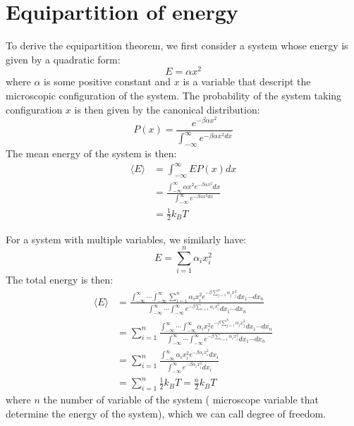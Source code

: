 \documentclass{article}
\begin{document}
\section{Equipartition of energy}
To derive the equipartition theorem, we first consider a system
whose energy is given by a quadratic form:
\begin{equation}
    E = \alpha x^2
\end{equation}
where $\alpha$ is some positive constant and $x$ is a variable
that descript the microscopic configuration of the system. The 
probability of the system taking configuration $x$ is then 
given by the canonical distribution:
\begin{equation}
    P(x) = \frac{e^{-\beta \alpha x^2}}{\int_{-\infty}^{\infty} e^{-\beta \alpha x^2 dx}}
\end{equation}
The mean energy of the system is then:
\begin{align}
    \langle E \rangle &= \int_{-\infty}^{\infty} E P(x) dx \\
        & = \frac{\int_{-\infty}^{\infty} \alpha x^2 e^{-\beta \alpha x^2} dx}{\int_{-\infty}^{\infty} e^{-\beta \alpha x^2 dx}} \\
        & = \frac{1}{2} k_B T
\end{align}

For a system with multiple variables, we similarly have:
\begin{equation}
    E = \sum_{i=1}^n \alpha_i x_i^2
\end{equation}
The total energy is then:
\begin{align}
    \langle E \rangle 
        & = \frac{\int_{-\infty}^{\infty}\cdots\int_{-\infty}^{\infty} \sum_{i=1}^n \alpha_i x_i^2 e^{-\beta \sum_{j=1}^n \alpha_j x_j^2} dx_1 \cdots dx_n}{\int_{-\infty}^{\infty}\cdots\int_{-\infty}^{\infty} e^{-\beta \sum_{i=1} \alpha_i x_i^2} dx_1 \cdots dx_n} \\
        & = \sum_{i=1}^n \frac{\int_{-\infty}^{\infty}\cdots\int_{-\infty}^{\infty} \alpha_i x_i^2 e^{-\beta \sum_{j=1}^n \alpha_j x_j^2} dx_1 \cdots dx_n}{\int_{-\infty}^{\infty}\cdots\int_{-\infty}^{\infty} e^{-\beta \sum_{i=1} \alpha_i x_i^2} dx_1 \cdots dx_n} \\
        & = \sum_{i=1}^n \frac{\int_{-\infty}^{\infty} \alpha_i x_i^2 e^{-\beta \alpha_i x_i^2}  dx_i }{\int_{-\infty}^{\infty} e^{-\beta \alpha_i x_i^2}  dx_i } \\
        & = \sum_{i=1}^n  \frac{1}{2} k_B T = \frac{n}{2} k_B T
\end{align}
where $n$ the number of variable of the system ( microscope variable that determine the energy of the system), which we can call degree of freedom.
\end{document}

